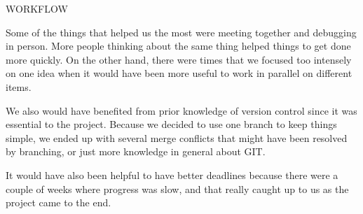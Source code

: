 

WORKFLOW


	Some of the things that helped us the most were meeting together and debugging in person. More people thinking about the same thing helped things to get done more quickly. On the other hand, there were times that we focused too intensely on one idea when it would have been more useful to work in parallel on different items.

	We also would have benefited from prior knowledge of version control since it was essential to the project. Because we decided to use one branch to keep things simple, we ended up with several merge conflicts that might have been resolved by branching, or just more knowledge in general about GIT.

	It would have also been helpful to have better deadlines because there were a couple of weeks where progress was slow, and that really caught up to us as the project came to the end.
